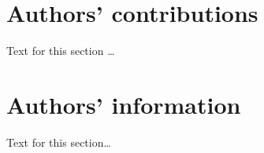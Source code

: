 \documentclass{bmcart}
\begin{document}
\begin{backmatter}
\section*{Authors' contributions}
Text for this section \ldots

\section*{Authors' information}%
Text for this section\ldots







\end{backmatter}
\end{document}
